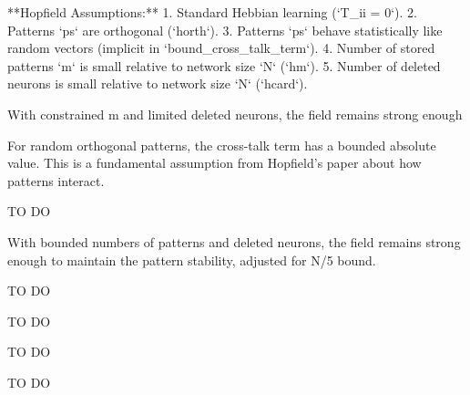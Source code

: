 \begin{theorem}
\begin{theorem}
\begin{lemma}
\begin{lemma}
\begin{lemma}
**Hopfield Assumptions:**
1.  Standard Hebbian learning (`T_{ii} = 0`).
2.  Patterns `ps` are orthogonal (`horth`).
3.  Patterns `ps` behave statistically like random vectors (implicit in `bound_cross_talk_term`).
4.  Number of stored patterns `m` is small relative to network size `N` (`hm`).
5.  Number of deleted neurons is small relative to network size `N` (`hcard`).
\end{lemma}

\begin{lemma}\label{field_remains_sufficient}
\leanok
With constrained m and limited deleted neurons, the field remains strong enough
\end{lemma}

\begin{lemma}\label{bound_cross_talk_term_abs}
\leanok
For random orthogonal patterns, the cross-talk term has a bounded absolute value.
This is a fundamental assumption from Hopfield's paper about how patterns interact.
\end{lemma}

\begin{lemma}\label{deleted_field_product_bound}
TO DO
\end{lemma}

\begin{lemma}\label{field_remains_sufficient_for_N_div_5}
With bounded numbers of patterns and deleted neurons, the field remains strong enough
    to maintain the pattern stability, adjusted for N/5 bound.
\end{lemma}

\begin{lemma}\label{hebbian_deleted_threshold_is_zero}
TO DO
\end{lemma}

\begin{lemma}\label{net_input_at_non_deleted_neuron}
TO DO
\end{lemma}

\begin{lemma}\label{product_net_input_activation_at_non_deleted_neuron}
TO DO
\end{lemma}

\begin{definition}\label{non_deleted_neuron_maintains_sign_of_activation}
TO DO
\end{definition}


\end{lemma}
\end{lemma}
\end{theorem}
\end{theorem}
